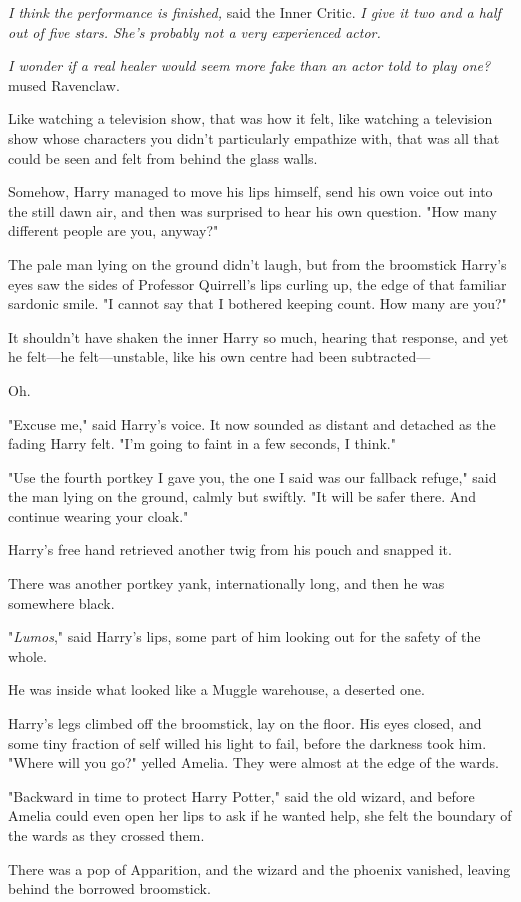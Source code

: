 \emph{I think the performance is finished,} said the Inner Critic. \emph{I give
it two and a half out of five stars. She’s probably not a very experienced
actor.}

\emph{I wonder if a real healer would seem more fake than an actor told to play
one?} mused Ravenclaw.

Like watching a television show, that was how it felt, like watching a
television show whose characters you didn’t particularly empathize with, that
was all that could be seen and felt from behind the glass walls.

Somehow, Harry managed to move his lips himself, send his own voice out into
the still dawn air, and then was surprised to hear his own question. "How many
different people are you, anyway?"

The pale man lying on the ground didn’t laugh, but from the broomstick Harry’s
eyes saw the sides of Professor Quirrell’s lips curling up, the edge of that
familiar sardonic smile. "I cannot say that I bothered keeping count. How many
are you?"

It shouldn’t have shaken the inner Harry so much, hearing that response, and
yet he felt—he felt—unstable, like his own centre had been subtracted—

Oh.

"Excuse me," said Harry’s voice. It now sounded as distant and detached as the
fading Harry felt. "I’m going to faint in a few seconds, I think."

"Use the fourth portkey I gave you, the one I said was our fallback refuge,"
said the man lying on the ground, calmly but swiftly. "It will be safer there.
And continue wearing your cloak."

Harry’s free hand retrieved another twig from his pouch and snapped it.

There was another portkey yank, internationally long, and then he was somewhere
black.

"\emph{Lumos}," said Harry’s lips, some part of him looking out for the safety
of the whole.

He was inside what looked like a Muggle warehouse, a deserted one.

Harry’s legs climbed off the broomstick, lay on the floor. His eyes closed, and
some tiny fraction of self willed his light to fail, before the darkness took
him.
\later
"Where will you go?" yelled Amelia. They were almost at the edge of the wards.

"Backward in time to protect Harry Potter," said the old wizard, and before
Amelia could even open her lips to ask if he wanted help, she felt the boundary
of the wards as they crossed them.

There was a pop of Apparition, and the wizard and the phoenix vanished, leaving
behind the borrowed broomstick.
